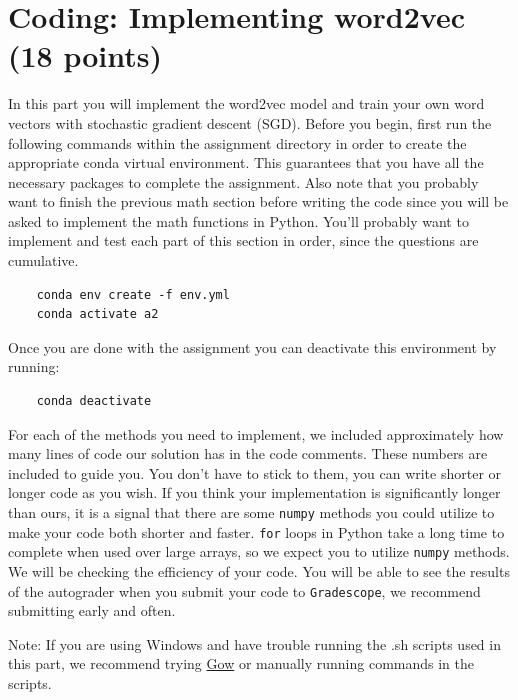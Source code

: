 \documentclass{article}
\begin{document}
\section{Coding: Implementing word2vec (18 points)}
In this part you will implement the word2vec model and train your own word vectors with stochastic gradient descent (SGD). Before you begin, first run the following commands within the assignment directory in order to create the appropriate conda virtual environment. This guarantees that you have all the necessary packages to complete the assignment. Also note that you probably want to finish the previous math section before writing the code since you will be asked to implement the math functions in Python. You’ll probably want to implement and test each part of this section in order, since the questions are cumulative.

\begin{verbatim}
    conda env create -f env.yml
    conda activate a2
\end{verbatim}

Once you are done with the assignment you can deactivate this environment by running:
\begin{verbatim}
    conda deactivate
\end{verbatim}

For each of the methods you need to implement, we included approximately how many lines of code our solution has in the code comments. These numbers are included to guide you. You don't have to stick to them, you can write shorter or longer code as you wish. If you think your implementation is significantly longer than ours, it is a signal that there are some \texttt{numpy} methods you could utilize to make your code both shorter and faster. \texttt{for} loops in Python take a long time to complete when used over large arrays, so we expect you to utilize \texttt{numpy} methods. We will be checking the efficiency of your code. You will be able to see the results of the autograder when you submit your code to \texttt{Gradescope}, we recommend submitting early and often.

Note: If you are using Windows and have trouble running the .sh scripts used in this part, we recommend trying \href{https://github.com/bmatzelle/gow}{Gow} or manually running commands in the scripts.
\end{document}
